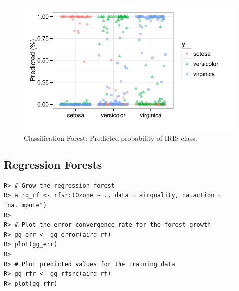 \documentclass[nojss]{jss}\usepackage[]{graphicx}\usepackage[]{color}
\makeatletter
\def\maxwidth{ %
  \ifdim\Gin@nat@width>\linewidth
    \linewidth
  \else
    \Gin@nat@width
  \fi
}
\newenvironment{kframe}{%
 \def\at@end@of@kframe{}%
 \ifinner\ifhmode%
  \def\at@end@of@kframe{\end{minipage}}%
  \begin{minipage}{\columnwidth}%
 \fi\fi%
 \def\FrameCommand##1{\hskip\@totalleftmargin \hskip-\fboxsep
 \colorbox{shadecolor}{##1}\hskip-\fboxsep
     \hskip-\linewidth \hskip-\@totalleftmargin \hskip\columnwidth}%
 \MakeFramed {\advance\hsize-\width
   \@totalleftmargin\z@ \linewidth\hsize
   \@setminipage}}%
 {\par\unskip\endMakeFramed%
 \at@end@of@kframe}
\newenvironment{knitrout}{}{} %
\makeatother
\begin{document}
\begin{knitrout}\footnotesize
{}\color{fgcolor}\begin{figure}[!htpb]


{\centering \includegraphics[width=\maxwidth]{figure/beamer-iris-rf-pred-1} 

}

\caption[Classification Forest]{Classification Forest: Predicted probability of IRIS class.\label{fig:iris-rf-pred}}
\end{figure}


\end{knitrout}


\subsection{Regression Forests}

\begin{knitrout}\footnotesize
{}\color{fgcolor}\begin{kframe}
\begin{verbatim}
R> # Grow the regression forest
R> airq_rf <- rfsrc(Ozone ~ ., data = airquality, na.action = "na.impute")
R> 
R> # Plot the error convergence rate for the forest growth
R> gg_err <- gg_error(airq_rf)
R> plot(gg_err)
R> 
R> # Plot predicted values for the training data
R> gg_rfr <- gg_rfsrc(airq_rf)
R> plot(gg_rfr)
\end{verbatim}
\end{kframe}
\end{knitrout}

\end{document}
